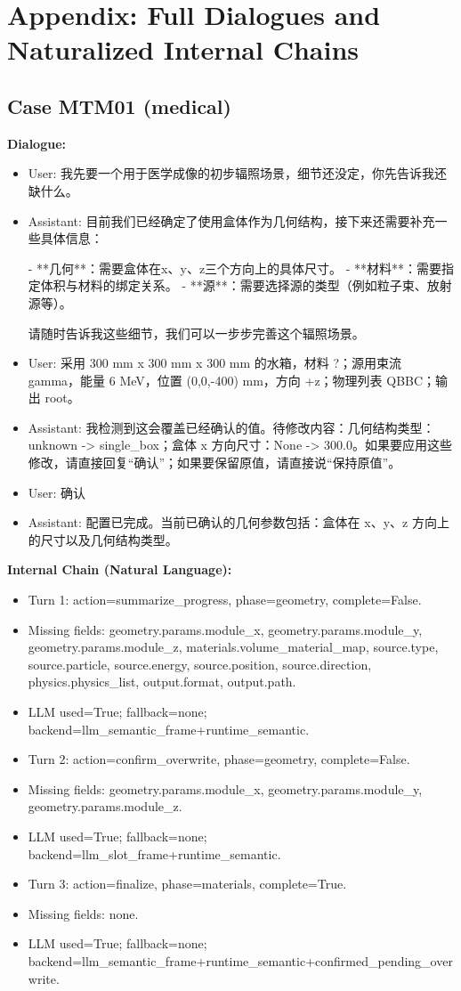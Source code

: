 \documentclass[11pt]{ctexart}
\begin{document}
\section{Appendix: Full Dialogues and Naturalized Internal Chains}
\subsection{Case MTM01 (medical)}
\textbf{Dialogue:}
\begin{itemize}
\item User: 我先要一个用于医学成像的初步辐照场景，细节还没定，你先告诉我还缺什么。
\item Assistant: 目前我们已经确定了使用盒体作为几何结构，接下来还需要补充一些具体信息：

- **几何**：需要盒体在x、y、z三个方向上的具体尺寸。
- **材料**：需要指定体积与材料的绑定关系。
- **源**：需要选择源的类型（例如粒子束、放射源等）。

请随时告诉我这些细节，我们可以一步步完善这个辐照场景。
\item User: 采用 300 mm x 300 mm x 300 mm 的水箱，材料 ?；源用束流 gamma，能量 6 MeV，位置 (0,0,-400) mm，方向 +z；物理列表 QBBC；输出 root。
\item Assistant: 我检测到这会覆盖已经确认的值。待修改内容：几何结构类型：unknown -> single\_box；盒体 x 方向尺寸：None -> 300.0。如果要应用这些修改，请直接回复“确认”；如果要保留原值，请直接说“保持原值”。
\item User: 确认
\item Assistant: 配置已完成。当前已确认的几何参数包括：盒体在 x、y、z 方向上的尺寸以及几何结构类型。
\end{itemize}
\textbf{Internal Chain (Natural Language):}
\begin{itemize}
\item Turn 1: action=summarize\_progress, phase=geometry, complete=False.
\item Missing fields: geometry.params.module\_x, geometry.params.module\_y, geometry.params.module\_z, materials.volume\_material\_map, source.type, source.particle, source.energy, source.position, source.direction, physics.physics\_list, output.format, output.path.
\item LLM used=True; fallback=none; backend=llm\_semantic\_frame+runtime\_semantic.
\item Turn 2: action=confirm\_overwrite, phase=geometry, complete=False.
\item Missing fields: geometry.params.module\_x, geometry.params.module\_y, geometry.params.module\_z.
\item LLM used=True; fallback=none; backend=llm\_slot\_frame+runtime\_semantic.
\item Turn 3: action=finalize, phase=materials, complete=True.
\item Missing fields: none.
\item LLM used=True; fallback=none; backend=llm\_semantic\_frame+runtime\_semantic+confirmed\_pending\_overwrite.
\end{itemize}
\end{document}
